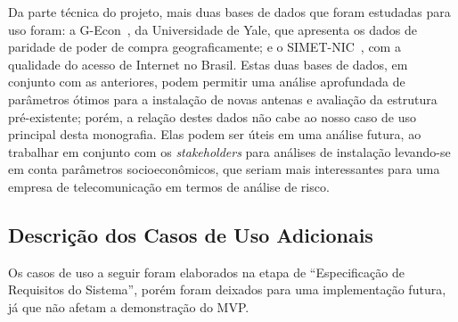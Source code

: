 \documentclass[]{politex}
\begin{document}
Da parte técnica do projeto, mais duas bases de dados que foram estudadas para
uso foram: a G-Econ~\cite{gecon}, da Universidade de Yale, que apresenta os
dados de paridade de poder de compra geograficamente; e o
SIMET-NIC~\cite{simet}, com a qualidade do acesso de Internet no Brasil. Estas
duas bases de dados, em conjunto com as anteriores, podem permitir uma análise
aprofundada de parâmetros ótimos para a instalação de novas antenas e avaliação
da estrutura pré-existente; porém, a relação destes dados não cabe ao nosso caso
de uso principal desta monografia. Elas podem ser úteis em uma análise futura,
ao trabalhar em conjunto com os \textit{stakeholders} para análises de
instalação levando-se em conta parâmetros socioeconômicos, que seriam mais
interessantes para uma empresa de telecomunicação em termos de análise de risco.

\subsection{Descrição dos Casos de Uso Adicionais}


Os casos de uso a seguir foram elaborados na etapa de ``Especificação de
Requisitos do Sistema'', porém foram deixados para uma implementação futura, já
que não afetam a demonstração do MVP.
\end{document}
